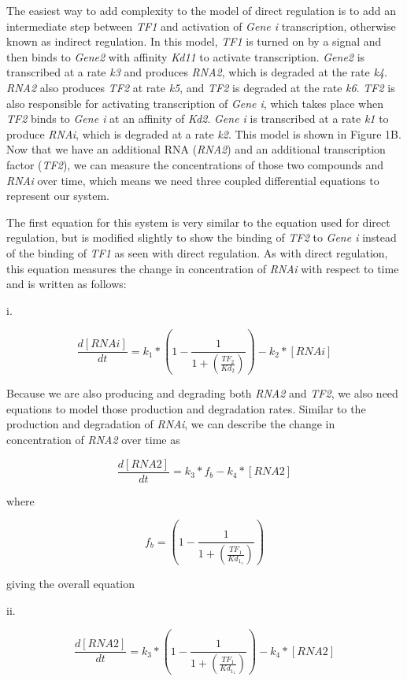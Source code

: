 \documentclass{article}
\begin{document}
The easiest way to add complexity to the model of direct regulation is to add an intermediate step between \textit{TF1} and activation of \textit{Gene i} transcription, otherwise known as indirect regulation. In this model, \textit{TF1} is turned on by a signal and then binds to \textit{Gene2} with affinity \textit{Kd11} to activate transcription. \textit{Gene2} is transcribed at a rate \textit{k3} and produces \textit{RNA2}, which is degraded at the rate \textit{k4}. \textit{RNA2} also produces \textit{TF2} at rate \textit{k5}, and \textit{TF2} is degraded at the rate \textit{k6}. \textit{TF2} is also responsible for activating transcription of \textit{Gene i}, which takes place when \textit{TF2} binds to \textit{Gene i} at an affinity of \textit{Kd2}. \textit{Gene i} is transcribed at a rate \textit{k1} to produce \textit{RNAi}, which is degraded at a rate \textit{k2}. This model is shown in Figure 1B. Now that we have an additional RNA (\textit{RNA2}) and an additional transcription factor (\textit{TF2}), we can measure the concentrations of those two compounds and \textit{RNAi} over time, which means we need three coupled differential equations to represent our system. 

The first equation for this system is very similar to the equation used for direct regulation, but is modified slightly to show the binding of \textit{TF2} to \textit{Gene i} instead of the binding of \textit{TF1} as seen with direct regulation. As with direct regulation, this equation measures the change in concentration of \textit{RNAi} with respect to time and is written as follows: 

i. 

\[
\frac{d[RNAi]}{dt} = k_1 * \left(1 - \frac{1}{1 + \left(\frac{TF_2}{Kd_2}\right)}\right) - k_2 * [RNAi]
\]

Because we are also producing and degrading both \textit{RNA2} and \textit{TF2}, we also need equations to model those production and degradation rates. Similar to the production and degradation of \textit{RNAi}, we can describe the change in concentration of \textit{RNA2} over time as 

\[
\frac{d[RNA2]}{dt} = k_3 * f_b - k_4 * [RNA2]
\]

where 

\[
f_b = \left(1 - \frac{1}{1 + \left(\frac{TF_1}{Kd_1_1}\right)}\right)
\]

giving the overall equation

ii. 

\[
\frac{d[RNA2]}{dt} = k_3 * \left(1 - \frac{1}{1 + \left(\frac{TF_1}{Kd_1_1}\right)}\right) - k_4 * [RNA2]
\]
\end{document}
